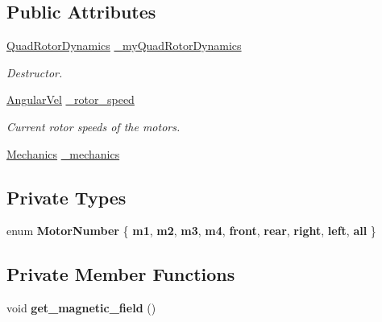 \subsection*{\-Public \-Attributes}
\begin{DoxyCompactItemize}
\item 
\hyperlink{classQuadRotorDynamics}{\-Quad\-Rotor\-Dynamics} \hyperlink{classgazebo_1_1GazeboModelPlugin_aa7c7b05e8f795ed76e5042a62fc829c4}{\-\_\-my\-Quad\-Rotor\-Dynamics}
\begin{DoxyCompactList}\small\item\em \-Destructor. \end{DoxyCompactList}\item 
\hypertarget{classgazebo_1_1GazeboModelPlugin_a20d35d7157cad810ac9aa1b92927579b}{\hyperlink{classAngularVel}{\-Angular\-Vel} \hyperlink{classgazebo_1_1GazeboModelPlugin_a20d35d7157cad810ac9aa1b92927579b}{\-\_\-rotor\-\_\-speed}}\label{classgazebo_1_1GazeboModelPlugin_a20d35d7157cad810ac9aa1b92927579b}

\begin{DoxyCompactList}\small\item\em \-Current rotor speeds of the motors. \end{DoxyCompactList}\item 
\hyperlink{classMechanics}{\-Mechanics} \hyperlink{classgazebo_1_1GazeboModelPlugin_a02f22e2315b742e4b76807364082d8ec}{\-\_\-mechanics}
\end{DoxyCompactItemize}
\subsection*{\-Private \-Types}
\begin{DoxyCompactItemize}
\item 
enum {\bfseries \-Motor\-Number} \{ \*
{\bfseries m1}, 
{\bfseries m2}, 
{\bfseries m3}, 
{\bfseries m4}, 
\*
{\bfseries front}, 
{\bfseries rear}, 
{\bfseries right}, 
{\bfseries left}, 
\*
{\bfseries all}
 \}
\end{DoxyCompactItemize}
\subsection*{\-Private \-Member \-Functions}
\begin{DoxyCompactItemize}
\item 
\hypertarget{classgazebo_1_1GazeboModelPlugin_ae962fe17fb145ccae51264b512905578}{void {\bfseries get\-\_\-magnetic\-\_\-field} ()}\label{classgazebo_1_1GazeboModelPlugin_ae962fe17fb145ccae51264b512905578}

\end{DoxyCompactItemize}
